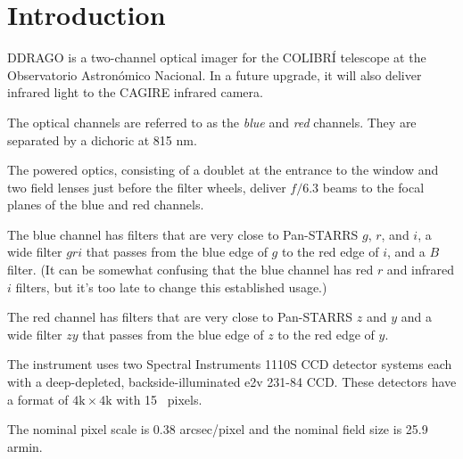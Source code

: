 \chapter{Introduction}

DDRAGO is a two-channel optical imager for the COLIBRÍ telescope at the Observatorio Astronómico Nacional. In a future upgrade, it will also deliver infrared light to the CAGIRE infrared camera.

The optical channels are referred to as the \emph{blue} and \emph{red} channels. They are separated by a dichoric at 815 nm. 

The powered optics, consisting of a doublet at the entrance to the window and two field lenses just before the filter wheels, deliver $f/6.3$ beams to the focal planes of the blue and red channels.

The blue channel has filters that are very close to Pan-STARRS $g$, $r$, and $i$, a wide filter $gri$ that passes from the blue edge of $g$ to the red edge of $i$, and a $B$ filter. (It can be somewhat confusing that the blue channel has red $r$ and infrared $i$ filters, but it's too late to change this established usage.)

The red channel has filters that are very close to Pan-STARRS $z$ and $y$ and a wide filter $zy$ that passes from the blue edge of $z$ to the red edge of $y$.

The instrument uses two Spectral Instruments 1110S CCD detector systems each with a deep-depleted, backside-illuminated e2v 231-84 CCD. These detectors have a format of $4\mathrm{k}\times4\mathrm{k}$ with 15~{\micron} pixels.

The nominal pixel scale is 0.38 \unit{arcsec/pixel} and the nominal field size is 25.9 \unit{armin}.
